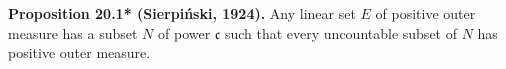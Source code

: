 \textbf{Proposition 20.1* (Sierpiński, 1924).} Any linear set $E$ of positive outer measure has a subset $N$ of power $\mathfrak{c}$ such that every uncountable subset of $N$ has positive outer measure.
